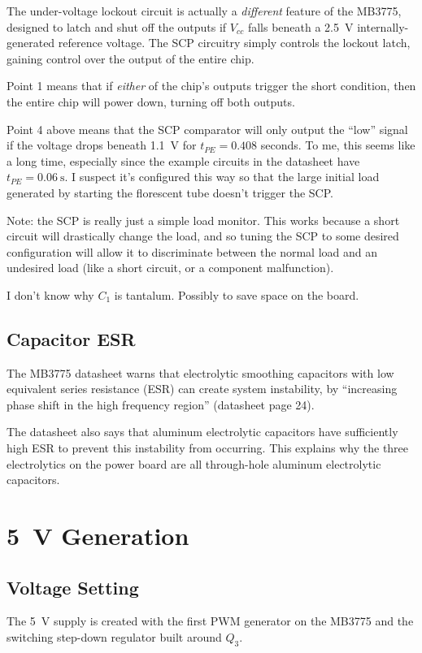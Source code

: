 \documentclass{article}
\newcommand{\Vcc}{$V_{cc}$}
\newcommand{\model}{\textsf}
\begin{document}
The under-voltage lockout circuit is actually a \emph{different}
feature of the \model{MB3775}, designed to latch and shut off the
outputs if \Vcc{} falls beneath a \qty{2.5}{\volt}
internally-generated reference voltage. The SCP circuitry simply
controls the lockout latch, gaining control over the output of the
entire chip.

Point 1 means that if \emph{either} of the chip's outputs trigger the
short condition, then the entire chip will power down, turning off
both outputs.

Point 4 above means that the SCP comparator will only output the
``low'' signal if the voltage drops beneath \qty{1.1}{\volt} for
$t_{PE} = 0.408$ seconds. To me, this seems like a long time,
especially since the example circuits in the datasheet have
$t_{PE} = \qty{0.06}{\second}$. I suspect it's configured this way so
that the large initial load generated by starting the florescent tube
doesn't trigger the SCP.

Note: the SCP is really just a simple load monitor. This works because
a short circuit will drastically change the load, and so tuning the
SCP to some desired configuration will allow it to discriminate
between the normal load and an undesired load (like a short circuit, or
a component malfunction).

I don't know why $C_1$ is tantalum. Possibly to save space on the board.

\subsection{Capacitor ESR}
The \model{MB3775} datasheet warns that electrolytic smoothing
capacitors with low equivalent series resistance (ESR) can create
system instability, by ``increasing phase shift in the high frequency
region'' (datasheet page 24).

The datasheet also says that aluminum electrolytic capacitors have
sufficiently high ESR to prevent this instability from occurring. This
explains why the three electrolytics on the power board are all
through-hole aluminum electrolytic capacitors.

\section{\qty{5}{\volt} Generation}
\subsection{Voltage Setting}
The \qty{5}{\volt} supply is created with the first PWM generator on
the \model{MB3775} and the switching step-down regulator built around
$Q_3$.
\end{document}
